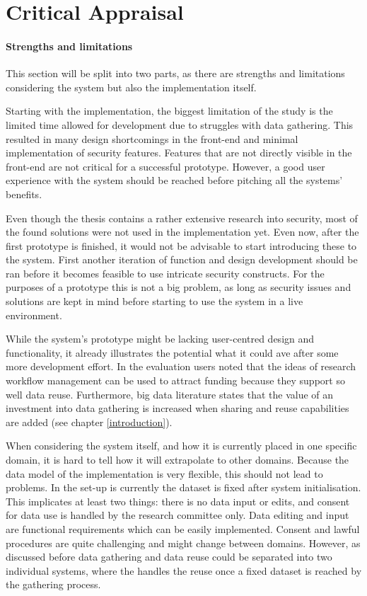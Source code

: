 \section{Critical Appraisal}

\paragraph{Strengths and limitations}
This section will be split into two parts, as there are strengths and limitations considering the system but also the implementation itself.

Starting with the implementation, the biggest limitation of the study is the limited time allowed for development due to struggles with data gathering.
This resulted in many design shortcomings in the front-end and minimal implementation of security features.
Features that are not directly visible in the front-end are not critical for a successful prototype.
However, a good user experience with the system should be reached before pitching all the systems' benefits.

Even though the thesis contains a rather extensive research into security, most of the found solutions were not used in the \ivfsystem{} implementation yet.
Even now, after the first prototype is finished, it would not be advisable to start introducing these to the system.
First another iteration of function and design development should be ran before it becomes feasible to use intricate security constructs.
For the purposes of a prototype this is not a big problem, as long as security issues and solutions are kept in mind before starting to use the system in a live environment.

While the system's prototype might be lacking user-centred design and functionality, it already illustrates the potential what it could ave after some more development effort.
In the evaluation users noted that the ideas of research workflow management can be used to attract funding because they support so well data reuse.
Furthermore, big data literature states that the value of an investment into data gathering is increased when sharing and reuse capabilities are added (see chapter \ref{introduction}).

When considering the system itself, and how it is currently placed in one specific domain, it is hard to tell how it will extrapolate to other domains.
Because the data model of the implementation is very flexible, this should not lead to problems.
In the set-up is currently the dataset is fixed after system initialisation.
This implicates at least two things: there is no data input or edits, and consent for data use is handled by the research committee only.
Data editing and input are functional requirements which can be easily implemented.
Consent and lawful procedures are quite  challenging and might change between domains.
However, as discussed before data gathering and data reuse could be separated into two individual systems, 
where the \ivfsystem{} handles the reuse once a fixed dataset is reached by the gathering process.

